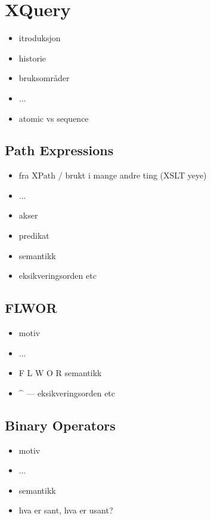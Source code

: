\section{XQuery}

\begin{itemize}
\item itroduksjon
\item historie
\item bruksomr\aa der
\item ...
\item atomic vs sequence
\end{itemize}


\subsection{Path Expressions}
\begin{itemize}
\item fra XPath / brukt i mange andre ting (XSLT yeye)
\item ...
\item akser
\item predikat
\item semantikk
\item eksikveringsorden etc
\end{itemize}

\subsection{FLWOR}

\begin{itemize}
\item motiv
\item ...
\item F L W O R semantikk
\item \^{} --- eksikveringsorden etc
\end{itemize}

\subsection{Binary Operators}

\begin{itemize}
\item motiv
\item ...
\item semantikk
\item hva er sant, hva er usant?
\end{itemize}



